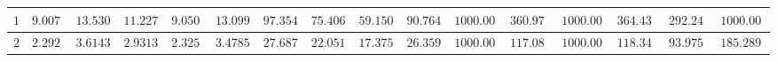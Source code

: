 \begin{table}[]
\begin{tabular}{|c|c|c|c|c|c|c|c|c|c|c|c|c|c|c|c}
$1$          & $9.007500$                                                        & $13.530000$                                                       & $11.227100$                                                         & $9.050100$                                                           & $13.099000$                                                             & $97.354900$                                                       & $75.406600$                                                         & $59.150100$                                                          & $90.764000$                                                             & $1000.000000$                                                     & $360.972700$                                                        & $1000.000000$                                                     & $364.436580$                                                        & $292.249960$                                                         & \multicolumn{1}{c|}{$1000.000000$}                                                           \\ \hline
$2$          & $2.292600$                                                        & $3.614300$                                                        & $2.931300$                                                          & $2.325800$                                                           & $3.478500$                                                              & $27.687900$                                                       & $22.051200$                                                         & $17.375200$                                                          & $26.359700$                                                             & $1000.000000$                                                     & $117.083000$                                                        & $1000.000000$                                                     & $118.340620$                                                        & $93.975200$                                                          & \multicolumn{1}{c|}{$185.289050$}                                                            \\ \hline

\end{tabular}
\end{table}
